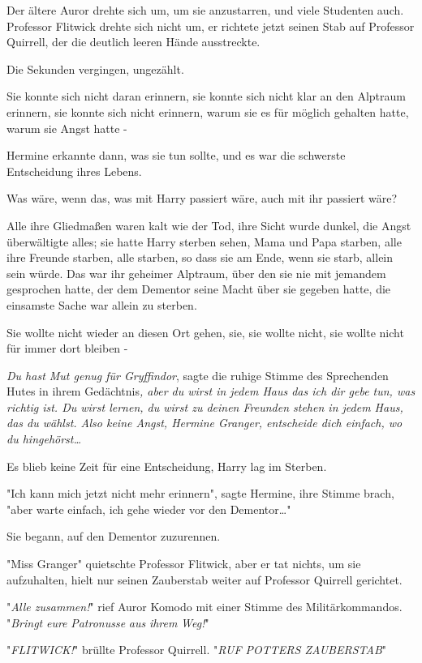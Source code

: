 {Der ältere Auror drehte sich um, um sie anzustarren, und viele Studenten auch. Professor Flitwick drehte sich nicht um, er richtete jetzt seinen Stab auf Professor Quirrell, der die deutlich leeren Hände ausstreckte.

Die Sekunden vergingen, ungezählt.

Sie konnte sich nicht daran erinnern, sie konnte sich nicht klar an den Alptraum erinnern, sie konnte sich nicht erinnern, warum sie es für möglich gehalten hatte, warum sie Angst hatte -

Hermine erkannte dann, was sie tun sollte, und es war die schwerste Entscheidung ihres Lebens.

Was wäre, wenn das, was mit Harry passiert wäre, auch mit ihr passiert wäre?

Alle ihre Gliedmaßen waren kalt wie der Tod, ihre Sicht wurde dunkel, die Angst überwältigte alles; sie hatte Harry sterben sehen, Mama und Papa starben, alle ihre Freunde starben, alle starben, so dass sie am Ende, wenn sie starb, allein sein würde. Das war ihr geheimer Alptraum, über den sie nie mit jemandem gesprochen hatte, der dem Dementor seine Macht über sie gegeben hatte, die einsamste Sache war allein zu sterben.

Sie wollte nicht wieder an diesen Ort gehen, sie, sie wollte nicht, sie wollte nicht für immer dort bleiben -

\emph{Du hast Mut genug für Gryffindor}, sagte die ruhige Stimme des Sprechenden Hutes in ihrem Gedächtnis\emph{, aber du wirst in jedem Haus das ich dir gebe tun, was richtig ist. Du wirst lernen, du wirst zu deinen Freunden stehen in jedem Haus, das du wählst. Also keine Angst, Hermine Granger, entscheide dich einfach, wo du hingehörst…}

Es blieb keine Zeit für eine Entscheidung, Harry lag im Sterben.

"Ich kann mich jetzt nicht mehr erinnern", sagte Hermine, ihre Stimme brach, "aber warte einfach, ich gehe wieder vor den Dementor…"

Sie begann, auf den Dementor zuzurennen.

"Miss Granger" quietschte Professor Flitwick, aber er tat nichts, um sie aufzuhalten, hielt nur seinen Zauberstab weiter auf Professor Quirrell gerichtet.

"\emph{Alle zusammen!}" rief Auror Komodo mit einer Stimme des Militärkommandos. "\emph{Bringt} \emph{eure} \emph{Patronusse} \emph{aus} \emph{ihrem} \emph{Weg!}"

"\emph{FLITWICK!}" brüllte Professor Quirrell. "\emph{RUF POTTERS ZAUBERSTAB}"

}
